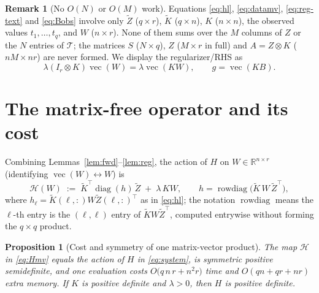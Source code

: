 \documentclass[12pt]{article}
\DeclareMathOperator{\vecop}{vec}
\DeclareMathOperator{\diag}{diag}
\newcommand{\bR}{\mathbb{R}}
\newcommand{\tZ}{\tilde Z}
\newcommand{\tK}{\tilde K}
\newtheorem{proposition}{Proposition}
\theoremstyle{definition}
\newtheorem{remark}{Remark}
\begin{document}
\begin{remark}[No $O(N)$ or $O(M)$ work]\label{rem:cost}
Equations \eqref{eq:hl}, \eqref{eq:datamv}, \eqref{eq:reg-text} and \eqref{eq:Bobs}
involve only $\tZ$ ($q\times r$), $\tK$ ($q\times n$), $K$ ($n\times n$), the
observed values $t_1,\dots,t_q$, and $W$ ($n\times r$). None of them sums over the
$M$ columns of $Z$ or the $N$ entries of $\mathcal T$; the matrices
$S$ ($N\times q$), $Z$ ($M\times r$ in full) and $A=Z\otimes K$ ($nM\times nr$)
are never formed. We display the regularizer/RHS as
\begin{equation}\label{eq:reg-text}
\lambda(I_r\otimes K)\vecop(W)=\lambda\vecop(KW),
\qquad g=\vecop(KB).
\end{equation}
\end{remark}

\section{The matrix-free operator and its cost}

Combining Lemmas~\ref{lem:fwd}--\ref{lem:reg}, the action of $H$ on
$W\in\bR^{n\times r}$ (identifying $\vecop(W)\leftrightarrow W$) is
\begin{equation}\label{eq:Hmv}
\mathcal H(W)\;:=\;\tK^\top\diag(h)\,\tZ\;+\;\lambda\,KW,
\qquad
h=\operatorname{rowdiag}\!\big(\tK\,W\,\tZ^\top\big),
\end{equation}
where $h_\ell=\tK(\ell,:)W\tZ(\ell,:)^\top$ as in \eqref{eq:hl}; the notation
$\operatorname{rowdiag}$ means the $\ell$-th entry is the $(\ell,\ell)$ entry of
$\tK W\tZ^\top$, computed entrywise without forming the $q\times q$ product.

\begin{proposition}[Cost and symmetry of one matrix-vector product]\label{prop:mvcost}
The map $\mathcal H$ in \eqref{eq:Hmv} equals the action of $H$ in
\eqref{eq:system}, is symmetric positive semidefinite, and one evaluation costs
$O\!\big(q\,n\,r+n^2 r\big)$ time and $O(qn+qr+n r)$ extra memory. If $K$ is
positive definite and $\lambda>0$, then $H$ is positive definite.
\end{proposition}
\end{document}
